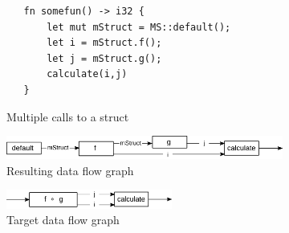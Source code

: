     \begin{figure}[H]
    \centering
    
    \begin{subfigure}[b]{0.6\textwidth}
         \centering
         \begin{verbatim}
   fn somefun() -> i32 {
       let mut mStruct = MS::default();
       let i = mStruct.f();
       let j = mStruct.g();
       calculate(i,j)
   }       
            \end{verbatim}
         \caption{Multiple calls to a struct}
         \label{multCalls}
     \end{subfigure}
     \par\bigskip
     \begin{subfigure}[b]{0.6\textwidth}
         \centering
         \includegraphics[width=\textwidth]{figures/graph_state_moved.png}
         \caption{Resulting data flow graph}
         \label{DFGStateMoved}
     \end{subfigure}
    \par\bigskip
     \begin{subfigure}[b]{0.6\textwidth}
         \centering
         \includegraphics[width=0.6\textwidth]{figures/graph_state_not_moved.png}
         \caption{Target data flow graph}
         \label{DFGStateNotMoved}
     \end{subfigure}
    \caption{}
    \label{fig:SimpleStateUseFigure}
    \end{figure}
    

